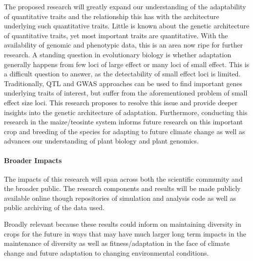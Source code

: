 The proposed research will greatly expand our understanding of the adaptability of quantitative traits and the relationship this has with the architecture underlying such quantitative traits. Little is known about the genetic architecture of quantitative traits, yet most important traits are quantitative. With the availability of genomic and phenotypic data, this is an area now ripe for further research. A standing question in evolutionary biology is whether adaptation generally happens from few loci of large effect or many loci of small effect. This is a difficult question to answer, as the detectability of small effect loci is limited. Traditionally, QTL and GWAS approaches can be used to find important genes underlying traits of interest, but suffer from the aforementioned problem of small effect size loci. This research proposes to resolve this issue and provide deeper insights into the genetic architecture of adaptation. Furthermore, conducting this research in the maize\//teosinte system informs future research on this important crop and breeding of the species for adapting to future climate change as well as advances our understanding of plant biology and plant genomics.


\paragraph{Broader Impacts}

The impacts of this research will span across both the scientific community and the broader public. The research components and results will be made publicly available online though repositories of simulation and analysis code as well as public archiving of the data used.


Broadly relevant because these results could inform on maintaining diversity in crops for the future in ways that may have much larger long term impacts in the maintenance of diversity as well as fitness/adaptation in the face of climate change and future adaptation to changing environmental conditions.


\begin{comment}
 Prepare Project Summary (limited to one page) of Proposed Fellowship Activities, including both
research and training. Select GO next to Project Summary. This is an abstract of the proposed research
and training. You must clearly address and identify in separate statements using the three boxes: (1) an
overview of your proposed fellowship activities; (2) intellectual merit; and (3) broader impacts of the
activities. Without these 3 sections, your application will be returned without review. List your
sponsoring scientist(s) and institution(s) in the overview. Upload text in the proper boxes. Do not use
the Supplementary Document option for the summary. Do not use jargon and abbreviations in the
summary. It should be understandable by scientists not in your specialized field
\end{comment}
